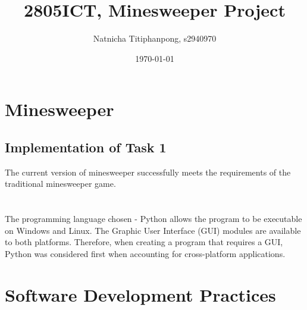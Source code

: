 \documentclass[12pt, a4]{report}
\title{2805ICT, Minesweeper Project}
\author{Natnicha Titiphanpong, s2940970}%
\date{\today}
\begin{document}
\begin{titlepage}
	\maketitle 
\end{titlepage}
	\tableofcontents
	\pagebreak
	\section{Minesweeper} 
	\subsection{Implementation of Task 1}
	\par The current  version of minesweeper successfully meets the requirements of the traditional minesweeper game. \\
	\\
	\\
	The programming language chosen - Python allows the program to be executable on Windows and Linux. The Graphic User Interface (GUI) modules are available to both platforms. Therefore, when creating a program that requires a GUI, Python was considered first when accounting for cross-platform applications.  
	
	\section{Software Development Practices}
\end{document}
